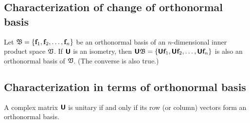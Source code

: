 \subsection {Characterization of change of orthonormal basis}

Let ${\frak B}=\{{\bf f}_1,  {\bf f}_2, \ldots , {\bf f}_n\}$
be an orthonormal basis of an $n$-dimensional inner product space ${\frak V}$.
If
$\textsf{\textbf{U}}$ is an isometry, then
 $\textsf{\textbf{U}}{\frak B}=\{\textsf{\textbf{U}}{\bf f}_1, \textsf{\textbf{U}} {\bf f}_2,
\ldots ,\textsf{\textbf{U}} {\bf f}_n\}$
is also an orthonormal basis of  ${\frak V}$.
(The converse is also true.)

\subsection {Characterization in terms of orthonormal basis}
\label{2012-m-ch-citoob}


A complex matrix $\textsf{\textbf{U}}$ is unitary if and only if its row (or column) vectors form
an orthonormal basis.

